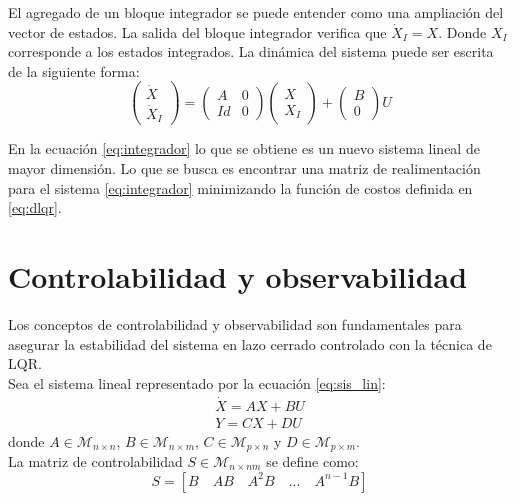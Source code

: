 \documentclass[main]{subfiles}
\begin{document}
El agregado de un bloque integrador se puede entender como una ampliaci\'on del vector de estados. La salida del bloque integrador verifica que $\dot{X}_I = X$. Donde $X_I$ corresponde a los estados integrados. La din\'amica del sistema puede ser escrita de la siguiente forma:
\begin{equation}
\label{eq:integrador}
\left(\begin{array}{c}
\dot{X}\\
\dot{X}_I
\end{array}\right) = \left( \begin{array}{cc}
A & 0\\
Id & 0
\end{array}\right)\left(\begin{array}{c}
X\\
X_I
\end{array}\right) + \left(\begin{array}{c}
B\\
0
\end{array}\right)U
\end{equation}  
 
En la ecuaci\'on \ref{eq:integrador} lo que se obtiene es un nuevo sistema lineal de mayor dimensi\'on. Lo que se busca es encontrar una matriz de realimentaci\'on para el sistema \ref{eq:integrador} minimizando la funci\'on de costos definida en \ref{eq:dlqr}.

\section{Controlabilidad y observabilidad}

Los conceptos de controlabilidad y observabilidad son fundamentales para asegurar la estabilidad del sistema en lazo cerrado controlado con la t\'ecnica de LQR.\\

Sea el sistema lineal representado por la ecuaci\'on \ref{eq:sis_lin}:
\begin{equation}
\label{eq:sis_lin}
\begin{array}{c}
\dot{X} = AX+BU \\
Y = CX+DU
\end{array}
\end{equation}
donde $A \in \mathcal{M}_{n \times n}$, $B \in \mathcal{M}_{n \times m}$, $C \in \mathcal{M}_{p \times n}$ y $D \in \mathcal{M}_{p \times m}$.\\

La matriz de controlabilidad $S\in \mathcal{M}_{n \times nm}$  se define como:
\begin{equation}
\label{eq:contr}
S = [B \quad AB \quad A^2B \quad ...\quad A^{n-1}B]
\end{equation}
\end{document}
